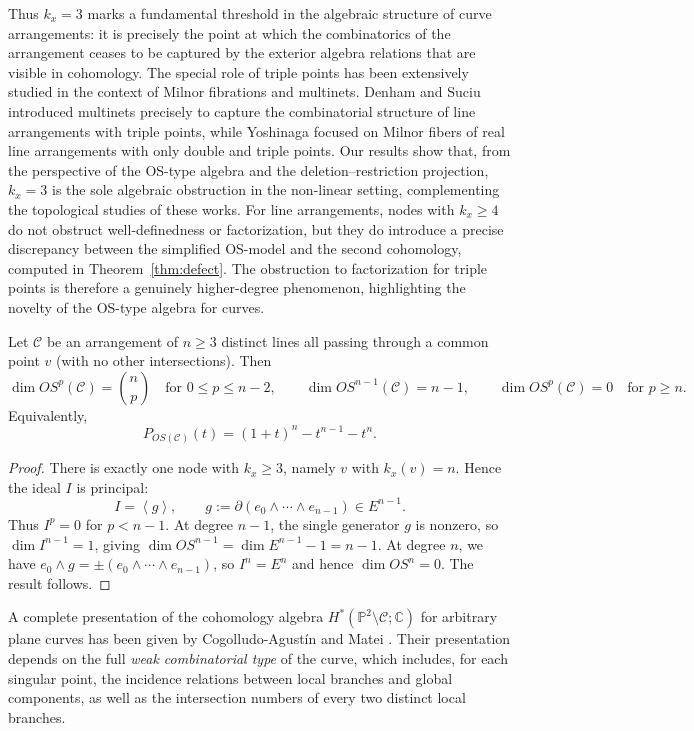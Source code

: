 \documentclass[article,11pt]{amsart} \numberwithin{equation}{section}
\numberwithin{equation}{section}
\begin{document}
{\begin{rk}
	Thus $k_x=3$ marks a fundamental threshold in the algebraic structure of curve arrangements: it is precisely the point at which the combinatorics of the arrangement ceases to be captured by the exterior algebra relations that are visible in cohomology. The special role of triple points has been extensively studied in the context of Milnor fibrations and multinets. Denham and Suciu \cite{DenhamSuciu2007} introduced multinets precisely to capture the combinatorial structure of line arrangements with triple points, while Yoshinaga \cite{Yoshinaga2013} focused on Milnor fibers of real line arrangements with only double and triple points. Our results show that, from the perspective of the OS-type algebra and the deletion--restriction projection, $k_x=3$ is the sole algebraic obstruction in the non-linear setting, complementing the topological studies of these works. For line arrangements, nodes with $k_x\ge4$ do not obstruct well-definedness or factorization, but they do introduce a precise discrepancy between the simplified OS-model and the second cohomology, computed in Theorem~\ref{thm:defect}. The obstruction to factorization for triple points is therefore a genuinely higher-degree phenomenon, highlighting the novelty of the OS-type algebra for curves.
\end{rk}

\begin{inp}
	\label{prop:concurrent_lines}
	Let $\mathcal C$ be an arrangement of $n\ge3$ distinct lines all passing through a common point $v$ (with no other intersections). Then
	\[
	\dim OS^p(\mathcal C)=\binom{n}{p}\quad\text{for }0\le p\le n-2,\qquad
	\dim OS^{n-1}(\mathcal C)=n-1,\qquad
	\dim OS^p(\mathcal C)=0\quad\text{for }p\ge n.
	\]
	Equivalently,
	\[
	P_{OS(\mathcal C)}(t)=(1+t)^n-t^{n-1}-t^n.
	\]
\end{inp}

\begin{proof}
	There is exactly one node with $k_x\ge3$, namely $v$ with $k_x(v)=n$. Hence the ideal $I$ is principal:
	\[
	I=\left\langle g\right\rangle,\qquad g:=\partial(e_0\wedge\cdots\wedge e_{n-1})\in E^{n-1}.
	\]
	Thus $I^p=0$ for $p<n-1$. At degree $n-1$, the single generator $g$ is nonzero, so $\dim I^{n-1}=1$, giving $\dim OS^{n-1}=\dim E^{n-1}-1=n-1$. At degree $n$, we have $e_0\wedge g=\pm(e_0\wedge\cdots\wedge e_{n-1})$, so $I^n=E^n$ and hence $\dim OS^n=0$. The result follows.
\end{proof}


\begin{rk}
	\label{rmk:comparison_CAM}
	A complete presentation of the cohomology algebra
	$H^*(\mathbb P^2\setminus\mathcal C;\mathbb C)$ for arbitrary plane curves
	has been given by Cogolludo-Agust\'in and Matei \cite{CogolludoMatei2012}.
	Their presentation depends on the full \emph{weak combinatorial type} of
	the curve, which includes, for each singular point, the incidence relations
	between local branches and global components, as well as the intersection
	numbers of every two distinct local branches.
	

\end{rk}}
\end{document}
